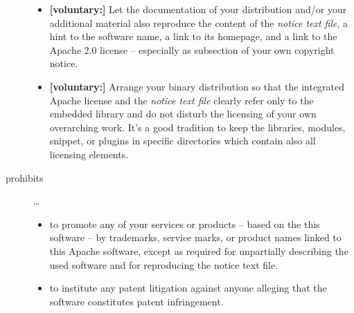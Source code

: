 \begin{description}
\begin{itemize}
  \item \textbf{[voluntary:]} Let the documentation of your distribution and/or
  your additional material also reproduce the content of the \emph{notice text
  file}, a hint to the software name, a link to its homepage, and a link to the
  Apache 2.0 license -- especially as subsection of your own copyright notice.
  
 \item \textbf{[voluntary:]} Arrange your binary distribution so that the
  integrated Apache license and the \emph{notice text file} clearly refer only
  to the embedded library and do not disturb the licensing of your own
  overarching work. It's a good tradition to keep the libraries, modules,
  snippet, or plugins in specific directories which contain also all licensing
  elements.
  
\end{itemize}

\item[prohibits] \ldots
\begin{itemize}
  \item to promote any of your services or products – based on the this software
  – by trademarks, service marks, or product names linked to this Apache
  software, except as required for unpartially describing the used software and
  for reproducing the notice text file.
  \item to institute any patent litigation against anyone alleging that the
  software constitutes patent infringement.
\end{itemize}

\end{description}

